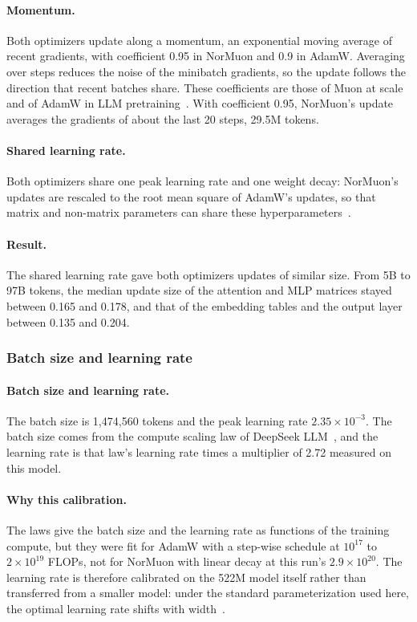 \documentclass[sigconf,nonacm,balance=false]{acmart}
\begin{document}
\paragraph{Momentum.} Both optimizers update along a momentum, an exponential moving average of recent gradients, with
coefficient 0.95 in NorMuon and 0.9 in AdamW. Averaging over steps reduces the noise of the minibatch gradients, so the
update follows the direction that recent batches share. These coefficients are those of Muon at
scale~\cite{liu2025muon} and of AdamW in LLM pretraining~\cite{deepseek2024llm}. With coefficient 0.95, NorMuon's
update averages the gradients of about the last 20 steps, 29.5M tokens.

\paragraph{Shared learning rate.} Both optimizers share one peak learning rate and one weight decay: NorMuon's updates
are rescaled to the root mean square of AdamW's updates, so that matrix and non-matrix parameters can share these
hyperparameters~\cite{liu2025muon}.

\paragraph{Result.} The shared learning rate gave both optimizers updates of similar size. From 5B to 97B tokens, the
median update size of the attention and MLP matrices stayed between 0.165 and 0.178, and that of the embedding tables
and the output layer between 0.135 and 0.204.

\subsubsection{Batch size and learning rate}
\label{sec:batch-lr}

\paragraph{Batch size and learning rate.} The batch size is 1,474,560 tokens and the peak learning rate
$2.35 \times 10^{-3}$. The batch size comes from the compute scaling law of DeepSeek LLM~\cite{deepseek2024llm}, and
the learning rate is that law's learning rate times a multiplier of 2.72 measured on this model.

\paragraph{Why this calibration.} The laws give the batch size and the learning rate as functions of the training
compute, but they were fit for AdamW with a step-wise schedule at $10^{17}$ to $2 \times 10^{19}$ FLOPs, not for
NorMuon with linear decay at this run's $2.9 \times 10^{20}$. The learning rate is therefore calibrated on the 522M
model itself rather than transferred from a smaller model: under the standard parameterization used here, the optimal
learning rate shifts with width~\cite{yang2022mup}.
\end{document}

